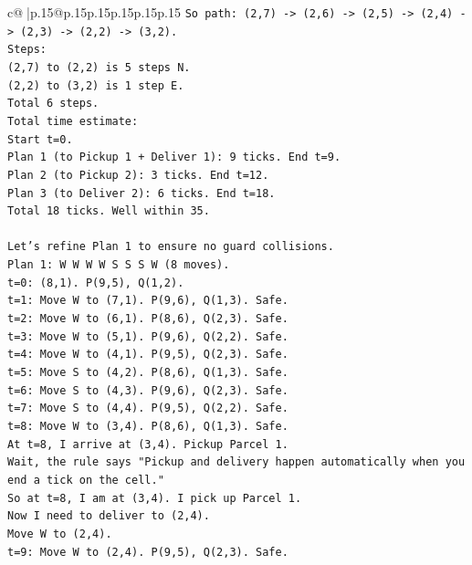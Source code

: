 \documentclass{article}
\begin{document}
{\begin{supertabular}{c@{$\;$}|p{.15\linewidth}@{}p{.15\linewidth}p{.15\linewidth}p{.15\linewidth}p{.15\linewidth}p{.15\linewidth}}
{{{\texttt{So path: (2,7) {-}> (2,6) {-}> (2,5) {-}> (2,4) {-}> (2,3) {-}> (2,2) {-}> (3,2).} \\
\texttt{Steps:} \\
\texttt{(2,7) to (2,2) is 5 steps N.} \\
\texttt{(2,2) to (3,2) is 1 step E.} \\
\texttt{Total 6 steps.} \\
\texttt{Total time estimate:} \\
\texttt{Start t=0.} \\
\texttt{Plan 1 (to Pickup 1 + Deliver 1): 9 ticks. End t=9.} \\
\texttt{Plan 2 (to Pickup 2): 3 ticks. End t=12.} \\
\texttt{Plan 3 (to Deliver 2): 6 ticks. End t=18.} \\
\texttt{Total 18 ticks. Well within 35.} \\
\\ 
\texttt{Let's refine Plan 1 to ensure no guard collisions.} \\
\texttt{Plan 1: W W W W S S S W (8 moves).} \\
\texttt{t=0: (8,1). P(9,5), Q(1,2).} \\
\texttt{t=1: Move W to (7,1). P(9,6), Q(1,3). Safe.} \\
\texttt{t=2: Move W to (6,1). P(8,6), Q(2,3). Safe.} \\
\texttt{t=3: Move W to (5,1). P(9,6), Q(2,2). Safe.} \\
\texttt{t=4: Move W to (4,1). P(9,5), Q(2,3). Safe.} \\
\texttt{t=5: Move S to (4,2). P(8,6), Q(1,3). Safe.} \\
\texttt{t=6: Move S to (4,3). P(9,6), Q(2,3). Safe.} \\
\texttt{t=7: Move S to (4,4). P(9,5), Q(2,2). Safe.} \\
\texttt{t=8: Move W to (3,4). P(8,6), Q(1,3). Safe.} \\
\texttt{At t=8, I arrive at (3,4). Pickup Parcel 1.} \\
\texttt{Wait, the rule says "Pickup and delivery happen automatically when you end a tick on the cell."} \\
\texttt{So at t=8, I am at (3,4). I pick up Parcel 1.} \\
\texttt{Now I need to deliver to (2,4).} \\
\texttt{Move W to (2,4).} \\
\texttt{t=9: Move W to (2,4). P(9,5), Q(2,3). Safe.} \\
}}}
\end{supertabular}}
\end{document}
